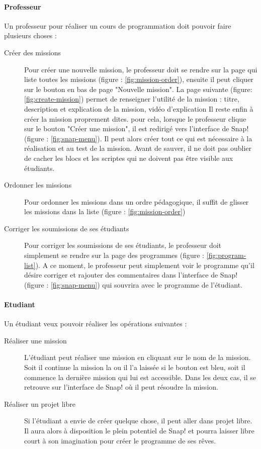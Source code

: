 \paragraph{Professeur}
Un professeur pour réaliser un cours de programmation doit pouvoir faire plusieurs choses :
\begin{description}
  \item[Créer des missions] Pour créer une nouvelle mission, le professeur doit se rendre sur la page qui liste toutes les missions (figure : \ref{fig:mission-order}), ensuite il peut cliquer sur le bouton en bas de page "Nouvelle mission". La page suivante (figure: \ref{fig:create-mission}) permet de renseigner l'utilité de la mission : titre, description et explication de la mission, vidéo d'explication \ldot Il reste enfin à créer la mission proprement dites. pour cela, lorsque le professeur clique sur le bouton "Créer une mission", il est redirigé vers l'interface de Snap! (figure : \ref{fig:snap-menu}). Il peut alors créer tout ce qui est nécessaire à la réalisation et au test de la mission. Avant de sauver, il ne doit pas oublier de cacher les blocs et les scriptes qui ne doivent pas être visible aux étudiants.
  \item[Ordonner les missions] Pour ordonner les missions dans un ordre pédagogique, il suffit de glisser les missions dans la liste (figure : \ref{fig:mission-order})
  \item[Corriger les soumissions de ses étudiants] Pour corriger les soumissions de ses étudiants, le professeur doit simplement se rendre sur la page des programmes (figure : \ref{fig:program-list}). A ce moment, le professeur peut simplement voir le programme qu'il désire corriger et rajouter des commentaires dans l'interface de Snap! (figure : \ref{fig:snap-menu}) qui souvrira avec le programme de l'étudiant.
\end{description}

\paragraph{Etudiant}
Un étudiant veux pouvoir réaliser les opérations suivantes :
\begin{description}
  \item[Réaliser une mission] L'étudiant peut réaliser une mission en cliquant sur le nom de la mission. Soit il continue la mission la ou il l'a laissée si le bouton est bleu, soit il commence la dernière mission qui lui est accessible. Dans les deux cas, il se retrouve sur l'interface de Snap! où il peut résoudre la mission.
  \item[Réaliser un projet libre] Si l'étudiant a envie de créer quelque chose, il peut aller dans projet libre. Il aura alors à disposition le plein potentiel de Snap! et pourra laisser libre court à son imagination pour créer le programme de ses rêves.
\end{description}

